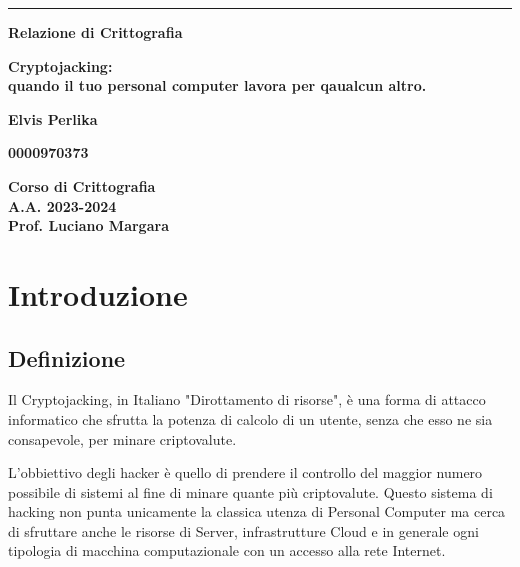 \documentclass[12pt,a4paper]{article}
\begin{document}
\begin{titlepage}
\begin{center}
\rule[0.5cm]{15.8cm}{0.6mm}
{\small{\bf Relazione di Crittografia }}
\end{center}
\vspace{15mm}
\begin{center}
{\LARGE{\bf Cryptojacking:} \\ 
\vspace{3mm}
{\bf quando il tuo personal computer lavora per qaualcun altro.}}
\end{center}
\vspace{35mm}
\par
\noindent
\begin{center}
{\large{\bf Elvis Perlika}}
\end{center}
\begin{center}
{\large{\bf 0000970373}}
\end{center}
\hfill

\vspace{70mm}
\begin{center}
{\large{\bf Corso di Crittografia \\ 
A.A. 2023-2024 \\
Prof. Luciano Margara}}
\end{center}
\end{titlepage}

\newpage

\tableofcontents

\newpage

\section{Introduzione}
\subsection{Definizione}

Il Cryptojacking, in Italiano "Dirottamento di risorse", è una forma di attacco
informatico che sfrutta la potenza di calcolo di un utente, senza che esso ne
sia consapevole, per minare criptovalute. \cite{CSO}

L'obbiettivo degli hacker è quello di prendere il controllo del maggior
numero possibile di sistemi al fine di minare quante più criptovalute. Questo sistema di hacking non punta unicamente la classica utenza
di Personal Computer ma cerca di sfruttare anche le risorse di Server,
infrastrutture Cloud e in generale ogni tipologia di macchina computazionale con un accesso alla rete Internet.
\end{document}
